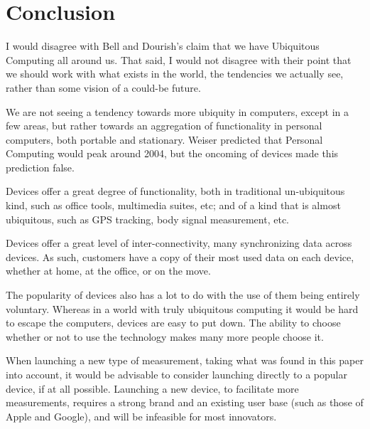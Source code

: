 \section{Conclusion}

I would disagree with Bell and Dourish's claim that we have Ubiquitous Computing all around us. That said, I would not disagree
with their point that we should work with what exists in the world, the tendencies we actually see, rather than some vision of
a could-be future.

We are not seeing a tendency towards more ubiquity in computers, except in a few areas, but rather towards an aggregation of
functionality in personal computers, both portable and stationary. Weiser predicted that Personal Computing would peak around
2004, but the oncoming of devices made this prediction false.

Devices offer a great degree of functionality, both in traditional un-ubiquitous kind, such as office tools, multimedia suites, etc;
and of a kind that is almost ubiquitous, such as GPS tracking, body signal measurement, etc.

Devices offer a great level of inter-connectivity, many synchronizing data across devices. As such, customers have a copy of their
most used data on each device, whether at home, at the office, or on the move.

The popularity of devices also has a lot to do with the use of them being entirely voluntary. Whereas in a world with truly ubiquitous
computing it would be hard to escape the computers, devices are easy to put down. The ability to choose whether or not to use the
technology makes many more people choose it.

When launching a new type of measurement, taking what was found in this paper into account, it would be advisable to consider launching
directly to a popular device, if at all possible. Launching a new device, to facilitate more measurements, requires a strong brand and
an existing user base (such as those of Apple and Google), and will be infeasible for most innovators.